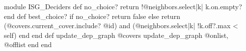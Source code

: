 \begin{rubyblock}
module ISG_Deciders
  def no_choice?
    return !@neighbors.select{|k| k.on}.empty?
  end
  def best_choice?
    if no_choice?
      return false
    else
      return (@covers.current_cover.include? @id) and (@neighbors.select{|k| !k.off?}.max < self)
    end
  end
  def update_dep_graph
    @covers update_dep_graph @onlist, @offlist
  end
end
\end{rubyblock}
